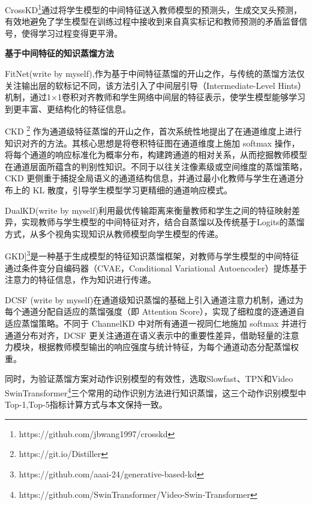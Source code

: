 \documentclass[10.5pt,letterpaper]{article}
\begin{document}
CrossKD\cite{wang-cvpr2024-crosskd}\footnote{https://github.com/jbwang1997/crosskd}通过将学生模型的中间特征送入教师模型的预测头，生成交叉头预测，有效地避免了学生模型在训练过程中接收到来自真实标记和教师预测的矛盾监督信号，使得学习过程变得更平滑。

\textbf{基于中间特征的知识蒸馏方法}

FitNet\cite{romero-iclr2015-fitnets}(write by myself),作为基于中间特征蒸馏的开山之作，与传统的蒸馏方法仅关注输出层的软标记不同，该方法引入了中间层引导（Intermediate-Level Hints）机制，通过1$\times$1卷积对齐教师和学生网络中间层的特征表示，使学生模型能够学习到更丰富、更结构化的特征信息。

CKD \cite{shu-iccv2021-channelkd}\footnote{https://git.io/Distiller} 作为通道级特征蒸馏的开山之作，首次系统性地提出了在通道维度上进行知识对齐的方法。其核心思想是将卷积特征图在通道维度上施加 softmax 操作，将每个通道的响应标准化为概率分布，构建跨通道的相对关系，从而挖掘教师模型在通道层面所蕴含的判别性知识。不同于以往关注像素级或空间维度的蒸馏策略，CKD 更侧重于捕捉全局语义的通道结构信息，并通过最小化教师与学生在通道分布上的 KL 散度，引导学生模型学习更精细的通道响应模式。

DualKD\cite{wang-tip2024-dkd}(write by myself)利用最优传输距离来衡量教师和学生之间的特征映射差异，实现教师与学生模型的中间特征对齐，结合自蒸馏以及传统基于Logits的蒸馏方式，从多个视角实现知识从教师模型向学生模型的传递。

GKD\cite{wang-aaai2024-gkd}]\footnote{https://github.com/aaai-24/generative-based-kd}是一种基于生成模型的特征知识蒸馏框架，对教师与学生模型的中间特征通过条件变分自编码器（CVAE，Conditional Variational Autoencoder）提炼基于注意力的特征信息，作为知识进行传递。

DCSF \cite{tao-aaai2025-channelkd}(write by myself)在通道级知识蒸馏的基础上引入通道注意力机制，通过为每个通道分配自适应的蒸馏强度（即 Attention Score），实现了细粒度的逐通道自适应蒸馏策略。不同于 ChannelKD 中对所有通道一视同仁地施加 softmax 并进行通道分布对齐，DCSF 更关注通道在语义表示中的重要性差异，借助轻量的注意力模块，根据教师模型输出的响应强度与统计特征，为每个通道动态分配蒸馏权重。



同时，为验证蒸馏方案对动作识别模型的有效性，选取Slowfast\cite{feichtenhofer-iccv2019-slowfast}、TPN\cite{yang-cvpr2020-temporal}和Video SwinTransformer\cite{liu-cvpr2022-video}\footnote{https://github.com/SwinTransformer/Video-Swin-Transformer}三个常用的动作识别方法进行知识蒸馏，这三个动作识别模型中Top-1,Top-5指标计算方式与本文保持一致。
\end{document}

